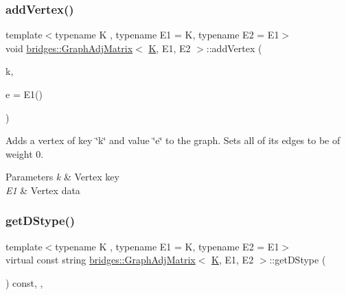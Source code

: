 \subsubsection{\texorpdfstring{addVertex()}{addVertex()}}
{\footnotesize\ttfamily template$<$typename K , typename E1  = K, typename E2  = E1$>$ \\
void \mbox{\hyperlink{classbridges_1_1_graph_adj_matrix}{bridges\+::\+Graph\+Adj\+Matrix}}$<$ \mbox{\hyperlink{namespacebridges_acfb0a4f7877d8f63de3e6862004c50edaa5f3c6a11b03839d46af9fb43c97c188}{K}}, E1, E2 $>$\+::add\+Vertex (\begin{DoxyParamCaption}\item[{const \mbox{\hyperlink{namespacebridges_acfb0a4f7877d8f63de3e6862004c50edaa5f3c6a11b03839d46af9fb43c97c188}{K}} \&}]{k,  }\item[{const E1 \&}]{e = {\ttfamily E1()} }\end{DoxyParamCaption})\hspace{0.3cm}{\ttfamily [inline]}}

Adds a vertex of key \char`\"{}k\char`\"{} and value \char`\"{}e\char`\"{} to the graph. Sets all of its edges to be of weight 0.


\begin{DoxyParams}{Parameters}
{\em k} & Vertex key \\
\hline
{\em E1} & Vertex data \\
\hline
\end{DoxyParams}
\mbox{\label{classbridges_1_1_graph_adj_matrix_a9b379d65e61755be82bbed01885f1367}} 
\subsubsection{\texorpdfstring{getDStype()}{getDStype()}}
{\footnotesize\ttfamily template$<$typename K , typename E1  = K, typename E2  = E1$>$ \\
virtual const string \mbox{\hyperlink{classbridges_1_1_graph_adj_matrix}{bridges\+::\+Graph\+Adj\+Matrix}}$<$ \mbox{\hyperlink{namespacebridges_acfb0a4f7877d8f63de3e6862004c50edaa5f3c6a11b03839d46af9fb43c97c188}{K}}, E1, E2 $>$\+::get\+D\+Stype (\begin{DoxyParamCaption}{ }\end{DoxyParamCaption}) const\hspace{0.3cm}{\ttfamily [inline]}, {\ttfamily [override]}, {\ttfamily [virtual]}}

